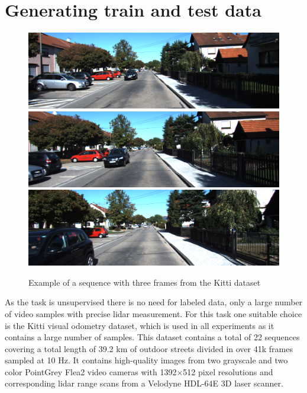 \section{Generating train and test data}
\begin{figure}[t]
\centering
\includegraphics[width=\textwidth]{images/img_first.png}
\includegraphics[width=\textwidth]{images/img_second.png}
\includegraphics[width=\textwidth]{images/img_third.png}
\caption{Example of a sequence with three frames from the Kitti dataset~\cite{geiger2012}}
\label{fig:frames}
\end{figure}

As the task is unsupervised there is no need for labeled data, only a large number of video samples with precise lidar measurement. For this task one suitable choice is the Kitti\cite{geiger2012} visual odometry dataset, which is used in all experiments as it contains a large number of samples. This dataset contains a total of 22 sequences covering a total length of 39.2 km of outdoor streets divided in over 41k frames sampled at 10 Hz. It contains high-quality images from two grayscale and two color PointGrey Flea2 video cameras with 1392×512 pixel resolutions and corresponding lidar range scans from a Velodyne HDL-64E 3D laser scanner.

